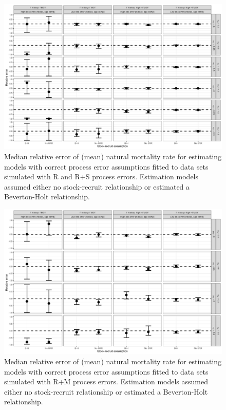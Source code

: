 \documentclass[
  12pt,
]{article}
\begin{document}
\begin{landscape}
\begin{figure}
\caption{Median relative error of (mean) natural mortality rate for estimating models with correct process error assumptions fitted to data sets simulated with R and R+S process errors. Estimation models assumed either no stock-recruit relationship or estimated a Beverton-Holt relationship.}\label{naa_om_M_relbias}
\begin{center}
\includegraphics[width = \textwidth]{naa_om_M_relerror.png}
\end{center}
\end{figure}
\end{landscape}

\begin{landscape}
\begin{figure}
\caption{Median relative error of (mean) natural mortality rate for estimating models with correct process error assumptions fitted to data sets simulated with R+M process errors. Estimation models assumed either no stock-recruit relationship or estimated a Beverton-Holt relationship.}\label{M_om_M_relbias}
\begin{center}
\includegraphics[width = \textwidth]{M_om_M_relerror.png}
\end{center}
\end{figure}
\end{landscape}
\end{document}
